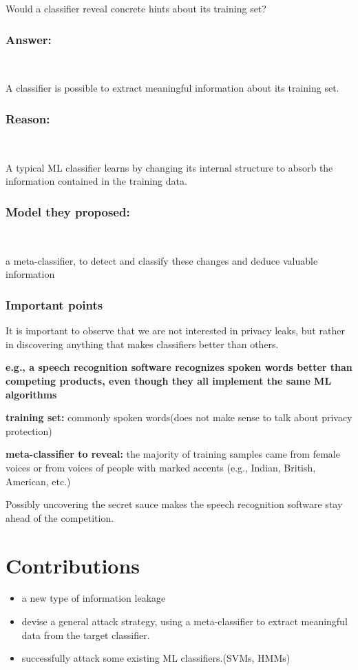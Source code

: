 \documentclass[11pt]{article}
\numberwithin{equation}{section}
\begin{document}
Would a classifier reveal concrete hints about its training set?
\subsubsection*{Answer:}~

A classifier is possible to extract meaningful information about its training set.

\subsubsection*{Reason:}~

A typical ML classifier learns by changing its internal structure to absorb the information contained in the training data.

\subsubsection*{Model they proposed:}~

a meta-classifier, to detect and classify these changes and deduce valuable information

\subsubsection*{\color{red}Important points}

It is important to observe that we are not interested in privacy leaks, but rather in discovering anything that makes classifiers better than others. 

\textbf{e.g., a speech recognition software recognizes spoken words better than competing products, even though they all implement the same ML algorithms}

\textbf{training set:} commonly spoken words(does not make sense to talk about privacy protection)

\textbf{meta-classifier to reveal:} the majority of training samples came from female voices or from voices of people with marked accents (e.g., Indian, British, American, etc.)

Possibly uncovering the secret sauce makes the speech recognition software stay ahead of the competition.

\section{Contributions}

\begin{itemize}
    \item a new type of information leakage
    \item devise a general attack strategy, using a meta-classifier to extract meaningful data from the target classifier.
    \item successfully attack some existing ML classifiers.(SVMs, HMMs)
\end{itemize}
\end{document}
